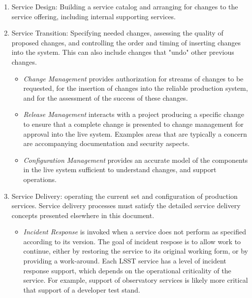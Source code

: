 \begin{enumerate}

\item Service Design: Building a service catalog and arranging for changes to the service offering, including internal supporting services.

\item Service Transition: Specifying needed changes, assessing the quality of proposed changes,
and controlling the order and timing of inserting changes into the system. This can also include changes that "undo" other previous changes.  

  \begin{itemize}

  \item \emph{Change Management} provides authorization for streams of changes to be requested, for the insertion of changes into the reliable production system, and for the assessment of the success of these changes.

  \item \emph{Release Management} interacts with a project producing a specific change to ensure that
a complete change is presented to change management for approval into the live system. Examples areas that are typically a concern are accompanying documentation and security aspects.

  \item \emph{Configuration Management} provides an accurate model of the components in the live system sufficient to understand changes, and support operations.

  \end{itemize}

\item Service Delivery: operating the current set and configuration of production services. Service delivery processes must satisfy the detailed service delivery concepts presented elsewhere in this document.

  \begin{itemize}

  \item \emph{Incident Response} is invoked when a service does not
  perform as specified according to its version.  The goal of
  incident respose is to allow work to continue, either by
  restoring the service to its original working form, or by providing
  a work-around.  Each LSST service has a level of incident
  response support, which depends on the operational criticality of the service.  For
  example, support of observatory services is likely more critical that support
  of a developer test stand.


\end{itemize}
\end{enumerate}
